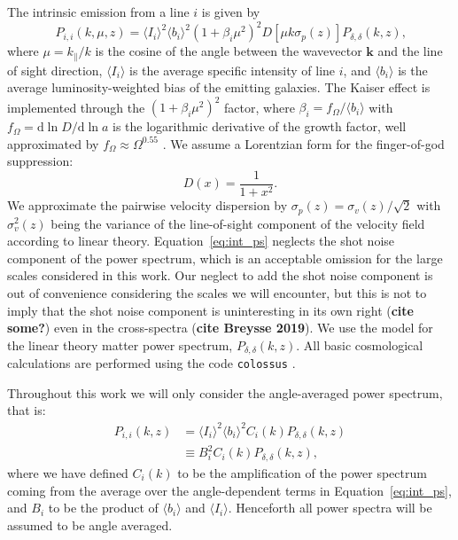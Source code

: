 \documentclass{aastex62}
\newcommand{\beq}{\begin{equation}}
\newcommand{\eeq}{\end{equation}}
\newcommand{\avg}[1]{\ensuremath{\langle #1 \rangle}}
\begin{document}
The intrinsic emission from a line $i$ is given by
\beq\label{eq:int_ps}
P_{i,i}(k, \mu, z) = \avg{I_i}^2 \avg{b_i}^2 (1 + \beta_i \mu^2)^2 
              D\left[\mu k \sigma_p(z)\right] P_{\delta, \delta}(k, z)\text{,}
\eeq
where $\mu=k_{\parallel}/k$ is the cosine of the angle between the wavevector
$\bm{k}$ and the line of sight direction, $\avg{I_i}$ is the average specific
intensity of line $i$, and $\avg{b_i}$ is the average luminosity-weighted bias
of the emitting galaxies. The Kaiser effect \citep{1987MNRAS.227....1K} is implemented
through the $(1 + \beta_i \mu^2)^2$ factor, where $\beta_i =
f_{\Omega}/\avg{b_i}$ with $f_{\Omega} = \text{d}\ln{D}/\text{d}\ln{a}$ is the
logarithmic derivative of the growth factor, well approximated by $f_{\Omega}
\approx \Omega^{0.55}$ \citep{2005PhRvD..72d3529L}. We assume a Lorentzian form for the
finger-of-god suppression:
\beq\label{eq:fog}
D(x) = \frac{1}{1+x^2}\text{.}
\eeq
We approximate the pairwise velocity dispersion by $\sigma_p(z) =
\sigma_v(z)/\sqrt{2}$ with $\sigma_v^2(z)$ being the variance of the
line-of-sight component of the velocity field according to linear theory.
Equation~\eqref{eq:int_ps} neglects the shot noise component of the power
spectrum, which is an acceptable omission for the large scales considered in
this work. Our neglect to add the shot noise component is out of convenience considering the scales we will encounter, but this is not to imply that the shot noise component is uninteresting in its own right ({\bf cite some?}) even in the cross-spectra ({\bf cite Breysse 2019}). We use the \citet{1998ApJ...496..605E} model for the linear theory
matter power spectrum, $P_{\delta,\delta}(k, z)$. All basic cosmological
calculations are performed using the code \texttt{colossus} \citep{2018ApJS..239...35D}.

Throughout this work we will only consider the angle-averaged power spectrum, that is:
\beq\label{eq:int_ps}
\begin{split}
P_{i,i}(k, z) &= \avg{I_i}^2 \avg{b_i}^2 C_i(k) P_{\delta, \delta}(k, z)\\
                   &\equiv B_i^2 C_i(k) P_{\delta, \delta}(k, z)\text{,}
\end{split}
\eeq
where we have defined $C_i(k)$ to be the amplification of the power spectrum
coming from the average over the angle-dependent terms in
Equation~\eqref{eq:int_ps}, and $B_i$ to be the product of $\avg{b_i}$ and
$\avg{I_i}$. Henceforth all power spectra will be assumed to be angle
averaged.
\end{document}
